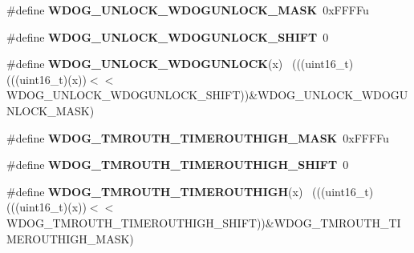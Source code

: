 \begin{DoxyCompactItemize}
\item 
\hypertarget{group___w_d_o_g___register___masks_gadcf9026f6f2730a765e504ec4c7126a8}{}\#define {\bfseries W\+D\+O\+G\+\_\+\+U\+N\+L\+O\+C\+K\+\_\+\+W\+D\+O\+G\+U\+N\+L\+O\+C\+K\+\_\+\+M\+A\+S\+K}~0x\+F\+F\+F\+Fu\label{group___w_d_o_g___register___masks_gadcf9026f6f2730a765e504ec4c7126a8}

\item 
\hypertarget{group___w_d_o_g___register___masks_ga07ed92839744d67e4c393b00bc293246}{}\#define {\bfseries W\+D\+O\+G\+\_\+\+U\+N\+L\+O\+C\+K\+\_\+\+W\+D\+O\+G\+U\+N\+L\+O\+C\+K\+\_\+\+S\+H\+I\+F\+T}~0\label{group___w_d_o_g___register___masks_ga07ed92839744d67e4c393b00bc293246}

\item 
\hypertarget{group___w_d_o_g___register___masks_ga7fd9cc224e9c1b23f313f9bf419a5596}{}\#define {\bfseries W\+D\+O\+G\+\_\+\+U\+N\+L\+O\+C\+K\+\_\+\+W\+D\+O\+G\+U\+N\+L\+O\+C\+K}(x)                            ~(((uint16\+\_\+t)(((uint16\+\_\+t)(x))$<$$<$W\+D\+O\+G\+\_\+\+U\+N\+L\+O\+C\+K\+\_\+\+W\+D\+O\+G\+U\+N\+L\+O\+C\+K\+\_\+\+S\+H\+I\+F\+T))\&W\+D\+O\+G\+\_\+\+U\+N\+L\+O\+C\+K\+\_\+\+W\+D\+O\+G\+U\+N\+L\+O\+C\+K\+\_\+\+M\+A\+S\+K)\label{group___w_d_o_g___register___masks_ga7fd9cc224e9c1b23f313f9bf419a5596}

\item 
\hypertarget{group___w_d_o_g___register___masks_ga4c46affdc0cd5ed2cde734812f783d31}{}\#define {\bfseries W\+D\+O\+G\+\_\+\+T\+M\+R\+O\+U\+T\+H\+\_\+\+T\+I\+M\+E\+R\+O\+U\+T\+H\+I\+G\+H\+\_\+\+M\+A\+S\+K}~0x\+F\+F\+F\+Fu\label{group___w_d_o_g___register___masks_ga4c46affdc0cd5ed2cde734812f783d31}

\item 
\hypertarget{group___w_d_o_g___register___masks_ga6565e44e33822cee4835856bfb88431e}{}\#define {\bfseries W\+D\+O\+G\+\_\+\+T\+M\+R\+O\+U\+T\+H\+\_\+\+T\+I\+M\+E\+R\+O\+U\+T\+H\+I\+G\+H\+\_\+\+S\+H\+I\+F\+T}~0\label{group___w_d_o_g___register___masks_ga6565e44e33822cee4835856bfb88431e}

\item 
\hypertarget{group___w_d_o_g___register___masks_gaa16e394f0074dc397d10388758afab4d}{}\#define {\bfseries W\+D\+O\+G\+\_\+\+T\+M\+R\+O\+U\+T\+H\+\_\+\+T\+I\+M\+E\+R\+O\+U\+T\+H\+I\+G\+H}(x)                      ~(((uint16\+\_\+t)(((uint16\+\_\+t)(x))$<$$<$W\+D\+O\+G\+\_\+\+T\+M\+R\+O\+U\+T\+H\+\_\+\+T\+I\+M\+E\+R\+O\+U\+T\+H\+I\+G\+H\+\_\+\+S\+H\+I\+F\+T))\&W\+D\+O\+G\+\_\+\+T\+M\+R\+O\+U\+T\+H\+\_\+\+T\+I\+M\+E\+R\+O\+U\+T\+H\+I\+G\+H\+\_\+\+M\+A\+S\+K)\label{group___w_d_o_g___register___masks_gaa16e394f0074dc397d10388758afab4d}


\end{DoxyCompactItemize}
